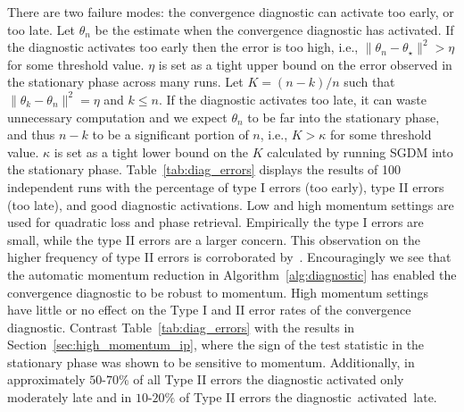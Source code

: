 \documentclass[conference]{IEEEtran}
\begin{document}
There are two failure modes: the convergence diagnostic can activate too early, or too late.
Let $\theta_n$ be the estimate when the convergence diagnostic has activated.
If the diagnostic activates too early then the error is too high, i.e., $\| \theta_n - \theta_\star \|^2 > \eta$ for some threshold value.
$\eta$ is set as a tight upper bound on the error observed in the stationary phase across many runs. 
Let $K = (n - k) / n$ such that $\| \theta_k - \theta_n \|^2 = \eta$ and $k \leq n$.
If the diagnostic activates too late, it can waste unnecessary computation and we expect $\theta_n$ to be far into the stationary phase, and thus $n-k$ to be a significant portion of  $n$, i.e., $K > \kappa$ for some threshold value. $\kappa$ is set as a tight lower bound on the $K$ calculated by running SGDM  into the stationary phase.
Table~\ref{tab:diag_errors} displays the results of 100 independent runs with the percentage of type I errors (too early), type II errors (too late), and good diagnostic activations.
Low and high momentum settings are used for quadratic loss and phase retrieval.
Empirically the type I errors are small, while the type II errors are a larger concern.
This observation on the higher frequency of type II errors is corroborated by~\cite{Proc:Chee_AISTATS18}. Encouragingly we see that the automatic momentum reduction in Algorithm~\ref{alg:diagnostic} has enabled the convergence diagnostic to be robust to momentum.
High momentum settings have little or no effect on the Type I and II error rates of the convergence diagnostic.
Contrast Table~\ref{tab:diag_errors} with the results in Section~\ref{sec:high_momentum_ip}, where the sign of the test statistic in the stationary phase was shown to be sensitive to momentum. 
Additionally, in approximately $50$-$70\%$ of all Type II errors the diagnostic activated only moderately late and in $10$-$20\%$ of Type II errors the diagnostic~activated~late.
\end{document}
